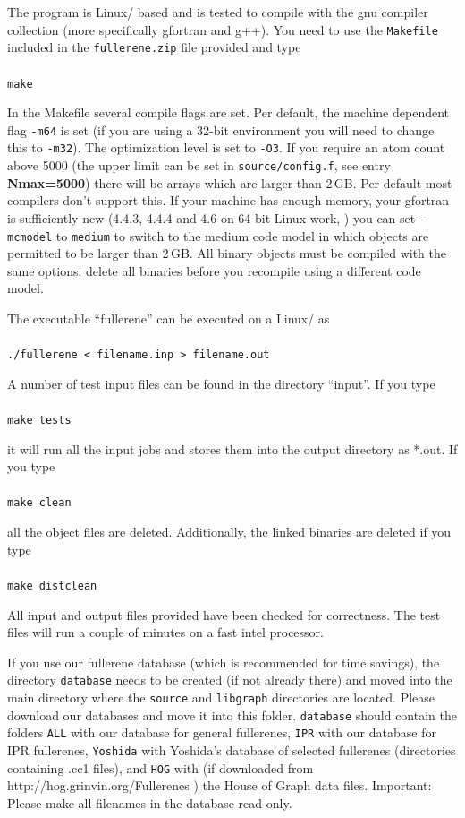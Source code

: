 \documentclass[article,a4paper,twoside]{memoir}
\let\acr=\textsmaller
\newcommand{\filename}[1]{\texttt{#1}}
\newcommand{\paramname}[1]{{\color{green}\textbf{#1}}}
\begin{document}
The program is Linux/\acr{UNIX} based and is tested to compile with the gnu compiler collection (more specifically gfortran and g++).
You need to use the \filename{Makefile} included in the \filename{fullerene.zip} file provided and type\\\\
\verb|make|

In the Makefile several compile flags are set.  Per default, the machine dependent flag \verb|-m64| is set (if you are
using a 32-bit environment you will need to change this to \verb|-m32|).  The optimization level is set to \verb|-O3|.  
If you require an atom count above 5000 (the upper limit can be set in \filename{source/config.f}, see entry \paramname{Nmax=5000})
there will be arrays which are larger than 2\,GB.  Per default most compilers don't support this.  If your machine has enough memory, your gfortran is sufficiently new
(4.4.3, 4.4.4  and 4.6 on 64-bit Linux work, ) you can set \verb|-mcmodel| to \verb|medium| to switch to the medium code model in
which objects are permitted to be larger than 2\,GB.  All binary objects must be compiled with the same options; delete all
binaries before you recompile using a different code model. 

The executable ``fullerene'' can be executed on a Linux/\acr{UNIX} as\\\\
\verb|./fullerene < filename.inp > filename.out|

A number of test input files can be found in the directory ``input''. If you type\\\\
\verb|make tests|

it will run all the input jobs and stores them into the output directory as *.out. If you type\\\\
\verb|make clean|

all the object files are deleted. Additionally, the linked binaries are deleted if you type\\\\
\verb|make distclean|

All input and output files provided have been checked for correctness. The test files will run a couple of minutes
on a fast intel processor.

If you use our fullerene database (which is recommended for time savings), the directory \filename{database} needs 
to be created (if not already there) and moved into the main directory where the \filename{source} and \filename{libgraph} 
directories are located. Please download our databases and move it into this folder. \filename{database} should contain
the folders \filename{ALL} with our database for general fullerenes, \filename{IPR} with our database 
for IPR fullerenes, \filename{Yoshida} with Yoshida's database of selected fullerenes (directories containing .cc1 files),
and \filename{HOG} with (if downloaded from http://hog.grinvin.org/Fullerenes ) the House of Graph data files. Important: 
Please make all filenames in the database read-only.
\end{document}
